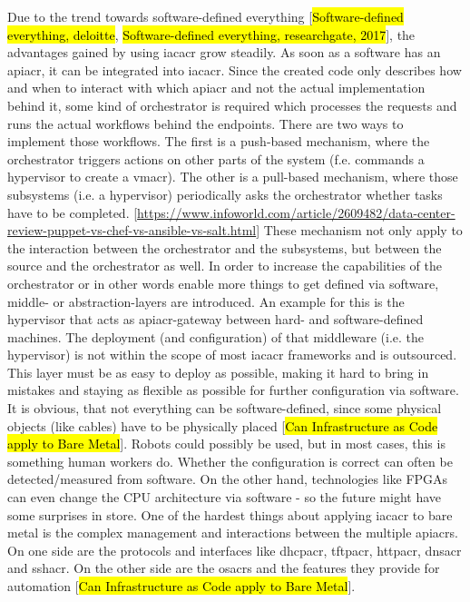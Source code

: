 \newline
Due to the trend towards software-defined everything [\hl{Software-defined everything, deloitte}, \hl{Software-defined everything, researchgate, 2017}], the advantages gained by using \gls{iacacr} grow steadily. As soon as a software has an \gls{apiacr}, it can be integrated into \gls{iacacr}. Since the created code only describes how and when to interact with which \gls{apiacr} and not the actual implementation behind it, some kind of orchestrator is required which processes the requests and runs the actual workflows behind the endpoints.
\newline
There are two ways to implement those workflows. The first is a push-based mechanism, where the orchestrator triggers actions on other parts of the system (f.e. commands a hypervisor to create a \gls{vmacr}). The other is a pull-based mechanism, where those subsystems (i.e. a hypervisor) periodically asks the orchestrator whether tasks have to be completed. [\url{https://www.infoworld.com/article/2609482/data-center-review-puppet-vs-chef-vs-ansible-vs-salt.html}]
\newline
These mechanism not only apply to the interaction between the orchestrator and the subsystems, but between the source and the orchestrator as well.
\newline
In order to increase the capabilities of the orchestrator or in other words enable more things to get defined via software, middle- or abstraction-layers are introduced. An example for this is the hypervisor that acts as \gls{apiacr}-gateway between hard- and software-defined machines. The deployment (and configuration) of that middleware (i.e. the hypervisor) is not within the scope of most \gls{iacacr} frameworks and is outsourced. This layer must be as easy to deploy as possible, making it hard to bring in mistakes and staying as flexible as possible for further configuration via software.
\newline
It is obvious, that not everything can be software-defined, since some physical objects (like cables) have to be physically placed [\hl{Can Infrastructure as Code apply to Bare Metal}]. Robots could possibly be used, but in most cases, this is something human workers do. Whether the configuration is correct can often be detected/measured from software. On the other hand, technologies like FPGAs can even change the CPU architecture via software - so the future might have some surprises in store.
\newline
One of the hardest things about applying \gls{iacacr} to bare metal is the complex management and interactions between the multiple \gls{apiacr}s. On one side are the  protocols and interfaces like \gls{dhcpacr}, \gls{tftpacr}, \gls{httpacr}, \gls{dnsacr} and \gls{sshacr}. On the other side are the \gls{osacr}s and the features they provide for automation [\hl{Can Infrastructure as Code apply to Bare Metal}].
